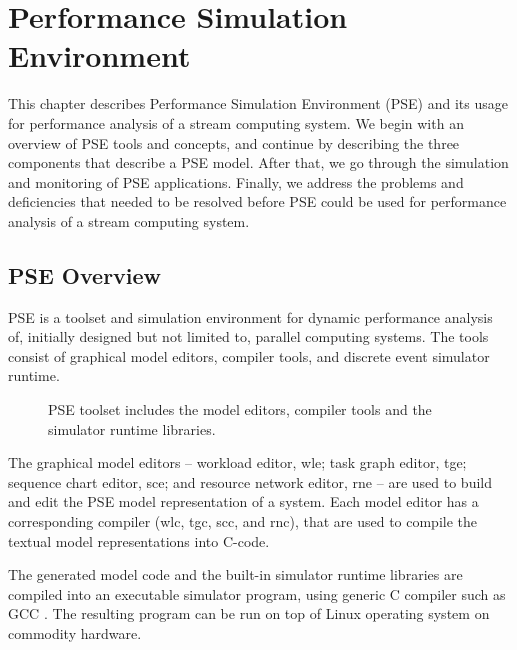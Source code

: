 \chapter{Performance Simulation Environment}
\label{chapter:performance-simulation-environment}

This chapter describes Performance Simulation Environment (PSE) and its usage for performance analysis of a stream computing system. We begin with an overview of PSE tools and concepts, and continue by describing the three components that describe a PSE model. After that, we go through the simulation and monitoring of PSE applications. Finally, we address the problems and deficiencies that needed to be resolved before PSE could be used for performance analysis of a stream computing system.

\section{PSE Overview}
\label{sec:pse-overview}

PSE is a toolset and simulation environment for dynamic performance analysis of, initially designed but not limited to, parallel computing systems. The tools consist of graphical model editors, compiler tools, and discrete event simulator runtime.

\begin{figure}[ht]
  \begin{center}
    \caption{PSE toolset includes the model editors, compiler tools and the simulator runtime libraries.}
    \label{fig:pse-toolset}
  \end{center}
\end{figure}

The graphical model editors -- workload editor, wle; task graph editor, tge; sequence chart editor, sce; and resource network editor, rne -- are used to build and edit the PSE model representation of a system. Each model editor has a corresponding compiler (wlc, tgc, scc, and rnc), that are used to compile the textual model representations into C-code.

The generated model code and the built-in simulator runtime libraries are compiled into an executable simulator program, using generic C compiler such as GCC \cite{stallman:2009:gcc}. The resulting program can be run on top of Linux operating system on commodity hardware.


